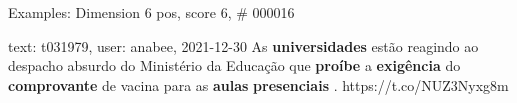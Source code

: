 \begin{frame}{Examples: Dimension 6 pos, score 6, \# 000016}
\footnotesize
\begin{exampleblock}{text: t031979, user: anabee, 2021-12-30}
As \textbf{universidades} estão reagindo ao despacho absurdo do Ministério da 
Educação que \textbf{proíbe} a \textbf{exigência} do \textbf{comprovante} de 
vacina para as \textbf{aulas} \textbf{presenciais} . https://t.co/NUZ3Nyxg8m 
\end{exampleblock}
\end{frame}
